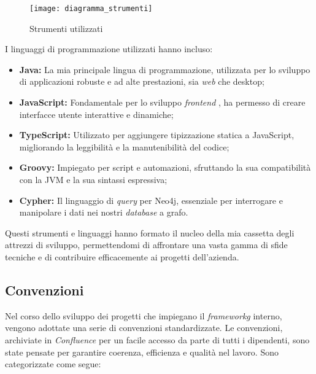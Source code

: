\begin{figure}[!h] 
  \centering 
  \texttt{[image: diagramma\_strumenti]} 
  \caption{Strumenti utilizzati}
  \label{fig:diagramma_strumenti}
\end{figure}

I linguaggi di programmazione utilizzati hanno incluso:

\begin{itemize}
\item \textbf{Java:} La mia principale lingua di programmazione, utilizzata per lo sviluppo di applicazioni robuste e ad alte prestazioni, sia \textit{web} che desktop;

\item \textbf{JavaScript:} Fondamentale per lo sviluppo \textit{frontend}  , ha permesso di creare interfacce utente interattive e dinamiche;

\item \textbf{TypeScript:} Utilizzato per aggiungere tipizzazione statica a JavaScript, migliorando la leggibilità e la manutenibilità del codice;

\item \textbf{Groovy:} Impiegato per script e automazioni, sfruttando la sua compatibilità con la \gls{JVM} e la sua sintassi espressiva;

\item \textbf{Cypher:} Il linguaggio di \textit{query} per Neo4j, essenziale per interrogare e manipolare i dati nei nostri \textit{database} a grafo.
\end{itemize}

Questi strumenti e linguaggi hanno formato il nucleo della mia cassetta degli attrezzi di sviluppo, permettendomi di affrontare una vasta gamma di sfide tecniche e di contribuire efficacemente 
ai progetti dell'azienda.

\subsection{Convenzioni}
Nel corso dello sviluppo dei progetti che impiegano il \textit{frameworkg} interno, vengono adottate una serie di convenzioni standardizzate. 
Le convenzioni, archiviate in \textit{Confluence} per un facile accesso da parte di tutti i dipendenti, 
sono state pensate per garantire coerenza, efficienza e qualità nel lavoro. Sono categorizzate come segue:

